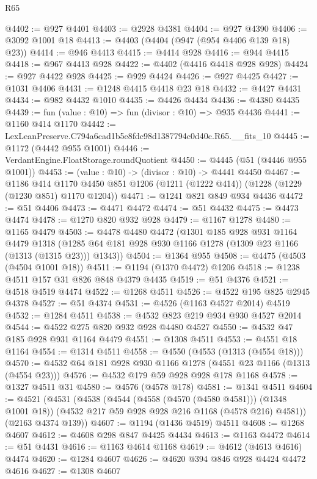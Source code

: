 \begin{lexlean}{R65}
\begin{coremodule}
@4402 := @927 @4401
@4403 := @2928 @4381
@4404 := @927 @4390
@4406 := @3092 @1001 @18
@4413 := @4403 (@4404 (@947 (@954 @4406 @139 @18) @23))
@4414 := @946 @4413
@4415 := @4414 @928
@4416 := @944 @4415
@4418 := @967 @4413 @928
@4422 := @4402 (@4416 @4418 @928 @928)
@4424 := @927 @4422 @928
@4425 := @929 @4424
@4426 := @927 @4425
@4427 := @1031 @4406
@4431 := @1248 @4415 @4418 @23 @18
@4432 := @4427 @4431
@4434 := @982 @4432 @1010
@4435 := @4426 @4434
@4436 := @4380 @4435
@4439 := fun (value : @10) => fun (divisor : @10) => @935 @4436
@4441 := @1160 @414 @1170
@4442 := LexLeanPreserve.C794a6cad1b5e8fdc98d1387794c0d40c.R65.__fits_10
@4445 := @1172 (@4442 @955 @1001)
@4446 := VerdantEngine.FloatStorage.roundQuotient
@4450 := @4445 (@51 (@4446 @955 @1001))
@4453 := (value : @10) -> (divisor : @10) -> @4441 @4450
@4467 := @1186
    @414
    @1170
    @4450
    @851
    @1206
    (@1211 (@1222 @414))
    (@1228 (@1229 (@1230 @851) @1170 @1204))
@4471 := @1241 @821 @849 @934 @4436
@4472 := @51 @4406
@4473 := @4471 @4472
@4474 := @51 @4432
@4475 := @4473 @4474
@4478 := @1270 @820 @932 @928
@4479 := @1167 @1278
@4480 := @1165 @4479
@4503 := @4478
    @4480
    @4472
    (@1301
      @185
      @928
      @931
      @1164
      @4479
      @1318
      (@1285 @64 @181 @928 @930 @1166 @1278 (@1309 @23 @1166 (@1313 (@1315 @23))) @1343))
@4504 := @1364 @955
@4508 := @4475 (@4503 (@4504 @1001 @18))
@4511 := @1194 (@1370 @4472) @1206
@4518 := @1238 @4511 @157 @31 @826 @848 @4379 @4435
@4519 := @51 @4376
@4521 := @4518 @4519 @4474
@4522 := @1268 @4511
@4526 := @4522 @195 @825 @2945 @4378
@4527 := @51 @4374
@4531 := @4526 (@1163 @4527 @2014) @4519
@4532 := @1284 @4511
@4538 := @4532 @823 @219 @934 @930 @4527 @2014
@4544 := @4522 @275 @820 @932 @928 @4480 @4527
@4550 := @4532 @47 @185 @928 @931 @1164 @4479
@4551 := @1308 @4511
@4553 := @4551 @18 @1164
@4554 := @1314 @4511
@4558 := @4550 (@4553 (@1313 (@4554 @18)))
@4570 := @4532 @64 @181 @928 @930 @1166 @1278 (@4551 @23 @1166 (@1313 (@4554 @23)))
@4576 := @4532 @179 @59 @928 @928 @178 @1168
@4578 := @1327 @4511 @31
@4580 := @4576 (@4578 @178)
@4581 := @1341 @4511
@4604 := @4521
    (@4531
      (@4538
        (@4544 (@4558 (@4570 (@4580 @4581))) (@1348 @1001 @18))
        (@4532 @217 @59 @928 @928 @216 @1168 (@4578 @216) @4581))
      (@2163 @4374 @139))
@4607 := @1194 (@1436 @4519) @4511
@4608 := @1268 @4607
@4612 := @4608 @298 @847 @4425 @4434
@4613 := @1163 @4472
@4614 := @51 @4431
@4616 := @1163 @4614 @1168
@4619 := @4612 (@4613 @4616) @4474
@4620 := @1284 @4607
@4626 := @4620 @394 @846 @928 @4424 @4472 @4616
@4627 := @1308 @4607

\end{coremodule}
\end{lexlean}
